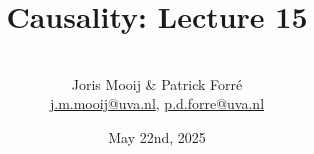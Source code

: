 \title[Causality]{Causality: Lecture 15}
\author[Joris Mooij]{\\[5mm]\large Joris Mooij \& Patrick Forr\'e\\
\url{j.m.mooij@uva.nl}, \url{p.d.forre@uva.nl}}
\date[2025-05-22]{\normalsize May 22nd, 2025}
\maketitle

